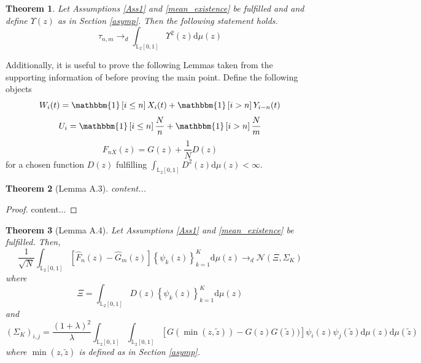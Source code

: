 \documentclass[12pt, a4paper]{article}
\theoremstyle{MAstyle} \newtheorem{assumption}{Assumption}[section]
\theoremstyle{MAstyle} \newtheorem{definition}{Definition}[section]
\theoremstyle{MAstyle} \newtheorem{theorem}{Theorem}[section]
\begin{document}
			\begin{theorem}\label{asymp_proof}
				Let Assumptions \ref{Ass1} and \ref{mean_existence} be fulfilled and  and define $\Upsilon(z)$ as in Section \ref{asymp}. Then the following statement holds.
				\begin{equation}
					\tau_{n,m} \rightarrow_d \int_{\mathbb{L}_2[0,1]}\Upsilon^2(z) \mathrm{d}\mu(z)
				\end{equation}
			\end{theorem}
			
			Additionally, it is useful to prove the following Lemmas taken from the supporting information of \cite{bugni_permutation_2021} before proving the main point.
			Define the following objects
				\begin{equation}
					W_i(t) = \mathbbm{1}\left[i \leq n\right] X_i(t) + \mathbbm{1}\left[i > n\right] Y_{i-n}(t)
				\end{equation}
				\begin{equation}
					U_i = \mathbbm{1}\left[i \leq n\right] \frac{N}{n} + \mathbbm{1}\left[i > n\right] \frac{N}{m}
				\end{equation}
				\begin{equation}
					F_{nX}(z) = G(z) + \frac{1}{N}D(z)
				\end{equation}
				for a chosen function $D(z)$ fulfilling $\int_{\mathbb{L}_2[0,1]}D^2(z) \mathrm{d} \mu(z) < \infty$.
			
			\begin{theorem}[Lemma A.3]
				content...
			\end{theorem}
		
			\begin{proof}
				content...
			\end{proof}
		
			\begin{theorem}[Lemma A.4]
				Let Assumptions \ref{Ass1} and \ref{mean_existence} be fulfilled. Then, 
				\begin{equation}
					\frac{1}{\sqrt{N}} \int_{\mathbb{L}_2[0,1]} \left[ \hat{F}_n(z) - \hat{G}_{m}(z) \right] \left\{\psi_k(z)\right\}_{k = 1}^K \mathrm{d}\mu(z)\rightarrow_d \mathcal{N}(\Xi, \Sigma_K)
				\end{equation}
				where 
				\begin{equation}
					\Xi = \int_{\mathbb{L}_2[0,1]}D(z) \left\{\psi_k(z)\right\}_{k = 1}^K \mathrm{d}\mu(z)
				\end{equation}
				and 
				\begin{equation}
					\left(\Sigma_K\right)_{i,j} = \frac{(1 + \lambda)^2}{\lambda} \int_{\mathbb{L}_2[0,1]}\int_{\mathbb{L}_2[0,1]} \left[G(\min(z, 	\tilde{z})) - G(z)G(\tilde{z}))\right] \psi_i(z) \psi_j(\tilde{z}) \mathrm{d}\mu(z) \mathrm{d}\mu(\tilde{z})
				\end{equation}
				where $\min(z, \tilde{z})$ is defined as in Section \ref{asymp}.
			\end{theorem}
		
\end{document}
